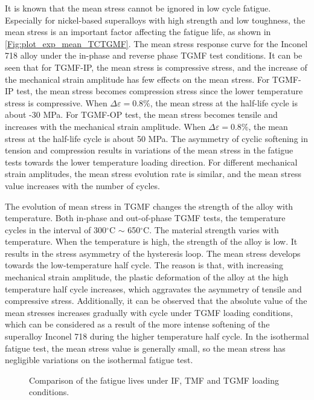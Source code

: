\documentclass[preprint,5p,twocolumn,10pt,sort&compress]{elsarticle}
\begin{document}
It is known that the mean stress cannot be ignored in low cycle fatigue. Especially for nickel-based superalloys with high strength and low toughness, the mean stress is an important factor affecting the fatigue life, as shown in \autoref{Fig:plot_exp_mean_TCTGMF}. The mean stress response curve for the Inconel 718 alloy under the in-phase and reverse phase TGMF test conditions. It can be seen that for TGMF-IP, the mean stress is compressive stress, and the increase of the mechanical strain amplitude has few effects on the mean stress. For TGMF-IP test, the mean stress becomes compression stress since the lower temperature stress is compressive. When $\Delta \varepsilon=0.8\%$, the mean stress at the half-life cycle is about -30 MPa. For TGMF-OP test, the mean stress becomes tensile and increases with the mechanical strain amplitude.
When $\Delta \varepsilon=0.8\%$, the mean stress at the half-life cycle is about 50 MPa. The asymmetry of cyclic softening in tension and compression results in variations of the mean stress in the fatigue tests towards the lower temperature loading direction. For different mechanical strain amplitudes, the mean stress evolution rate is similar, and the mean stress value increases with the number of cycles.

The evolution of mean stress in TGMF changes the strength of the alloy with temperature. Both in-phase and out-of-phase TGMF tests, the temperature cycles in the interval of 300$^\circ$C $\sim$ 650$^\circ$C. The material strength varies with temperature. When the temperature is high, the strength of the alloy is low. It results in the stress asymmetry of the hysteresis loop. The mean stress develops towards the low-temperature half cycle.
The reason is that, with increasing mechanical strain amplitude, the plastic deformation of the alloy at the high temperature half cycle increases, which aggravates the asymmetry of tensile and compressive stress.
Additionally, it can be observed that the absolute value of the mean stresses increases gradually with cycle under TGMF loading conditions, which can be considered as a result of the more intense softening of the superalloy Inconel 718 during the higher temperature half cycle. In the isothermal fatigue test, the mean stress value is generally small, so the mean stress has negligible variations on the isothermal fatigue test.

\begin{figure}[!ht]
\caption{Comparison of the fatigue lives under IF, TMF and TGMF loading conditions.}
\label{Fig:plot_exp_fatigue_life_TGMF}
\end{figure}
\end{document}
